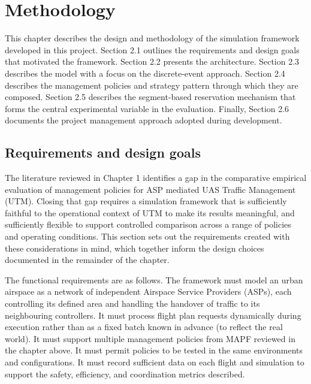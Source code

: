 \chapter{Methodology}
\label{chapter2}


This chapter describes the design and methodology of the simulation framework developed in this project. Section 2.1 outlines the requirements and design goals that motivated the framework. Section 2.2 presents the architecture. Section 2.3 describes the model with a focus on the discrete-event approach. Section 2.4 describes the management policies and strategy pattern through which they are composed. Section 2.5 describes the segment-based reservation mechanism that forms the central experimental variable in the evaluation. Finally, Section 2.6 documents the project management approach adopted during development. \par

\vspace{1em}

\section{Requirements and design goals}

The literature reviewed in Chapter 1 identifies a gap in the comparative empirical evaluation of management policies for ASP mediated UAS Traffic Management (UTM). Closing that gap requires a simulation framework that is sufficiently faithful to the operational context of UTM to make its results meaningful, and sufficiently flexible to support controlled comparison across a range of policies and operating conditions. This section sets out the requirements created with these considerations in mind, which together inform the design choices documented in the remainder of the chapter. \par

\vspace{1em}

The functional requirements are as follows. The framework must model an urban airspace as a network of independent Airspace Service Providers (ASPs), each controlling its defined area and handling the handover of traffic to its neighbouring controllers. It must process flight plan requests dynamically during execution rather than as a fixed batch known in advance (to reflect the real world). It must support multiple management policies from MAPF reviewed in the chapter above. It must permit policies to be tested in the same environments and configurations. It must record sufficient data on each flight and simulation to support the safety, efficiency, and coordination metrics described. \par

